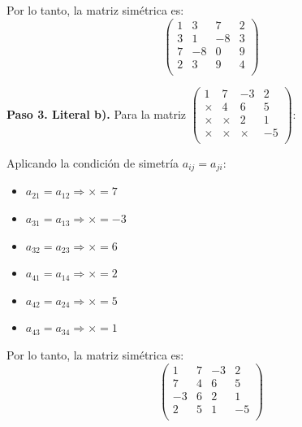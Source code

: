 \begin{prob}
\begin{myproof}
Por lo tanto, la matriz simétrica es:
$$\boxed{\left( \begin{array}{cccc}
1&3 &7 &2 \\
3&1&-8 &3 \\
7&-8&0&9 \\
2&3&9&4 \\
\end{array} \right)}$$

\textbf{Paso 3. Literal b).} Para la matriz $\left( \begin{array}{cccc}
1&7 &-3 &2 \\
\times &4& 6 & 5 \\
\times &\times &2& 1 \\
\times &\times &\times &-5 \\
\end{array} \right)$:

Aplicando la condición de simetría $a_{ij} = a_{ji}$:
\begin{itemize}
\item $a_{21} = a_{12} \Rightarrow \times = 7$
\item $a_{31} = a_{13} \Rightarrow \times = -3$
\item $a_{32} = a_{23} \Rightarrow \times = 6$
\item $a_{41} = a_{14} \Rightarrow \times = 2$
\item $a_{42} = a_{24} \Rightarrow \times = 5$
\item $a_{43} = a_{34} \Rightarrow \times = 1$
\end{itemize}

Por lo tanto, la matriz simétrica es:
$$\boxed{\left( \begin{array}{cccc}
1&7 &-3 &2 \\
7 &4& 6 & 5 \\
-3 &6 &2& 1 \\
2 &5 &1 &-5 \\
\end{array} \right)}$$

\end{myproof}
\end{prob}

